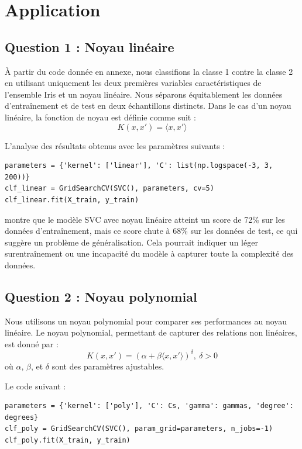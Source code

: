 \documentclass{article}
\begin{document}
\section{Application}

\subsection{Question 1 : Noyau linéaire}
\hspace{7pt} À partir du code donnée en annexe, nous classifions la classe 1 contre la classe 2 en utilisant uniquement les deux premières variables caractéristiques de l'ensemble Iris et un noyau linéaire. Nous séparons équitablement les données d'entraînement et de test en deux échantillons distincts. Dans le cas d'un noyau linéaire, la fonction de noyau est définie comme suit :
\[
K(x, x') = \langle x, x' \rangle
\]
    
\hspace{7pt} L'analyse des résultats obtenus avec les paramètres suivants :
\begin{lstlisting}
parameters = {'kernel': ['linear'], 'C': list(np.logspace(-3, 3, 200))}
clf_linear = GridSearchCV(SVC(), parameters, cv=5)
clf_linear.fit(X_train, y_train)
\end{lstlisting}
montre que le modèle SVC avec noyau linéaire atteint un score de 72\% sur les données d'entraînement, mais ce score chute à 68\% sur les données de test, ce qui suggère un problème de généralisation. Cela pourrait indiquer un léger surentraînement ou une incapacité du modèle à capturer toute la complexité des données.

\subsection{Question 2 : Noyau polynomial}

\hspace{7pt} Nous utilisons un noyau polynomial pour comparer ses performances au noyau linéaire. Le noyau polynomial, permettant de capturer des relations non linéaires, est donné par :
\[
K(x, x') = (\alpha + \beta \langle x, x' \rangle)^\delta, \ \delta > 0
\]
    où \(\alpha\), \(\beta\), et \(\delta\) sont des paramètres ajustables.\newline

    \hspace{7pt}Le code suivant :
\begin{lstlisting}
parameters = {'kernel': ['poly'], 'C': Cs, 'gamma': gammas, 'degree': degrees}
clf_poly = GridSearchCV(SVC(), param_grid=parameters, n_jobs=-1)
clf_poly.fit(X_train, y_train)
\end{lstlisting}
\end{document}
